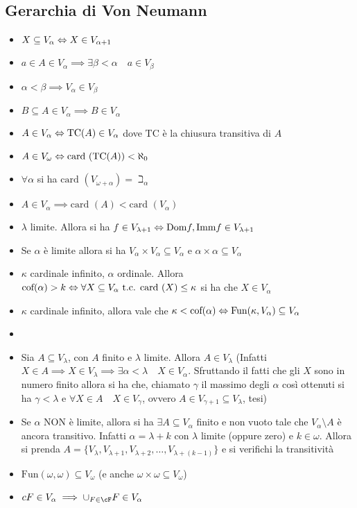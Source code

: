 \documentclass[a4paper,NoNotes,GeneralMath]{stdmdoc}
\newcommand{\card}[1]{\text{card }({#1})}
\newcommand{\cof}[1]{\text{cof}({#1})}
\newcommand{\Fun}{\text{Fun}}
\newcommand{\TC}{\text{TC}}
\newcommand{\Dom}{\text{Dom}}
\newcommand{\Imm}{\text{Imm}}
\begin{document}
	\subsection*{Gerarchia di Von Neumann}
	\begin{itemize}
		\item $X \subseteq V_\alpha \Leftrightarrow X \in V_{\alpha + 1}$
		\item $a \in A \in V_\alpha \implies \exists \beta < \alpha \quad a \in V_\beta$
		\item $\alpha < \beta \implies V_\alpha \in V_\beta$
		\item $B \subseteq A \in V_\alpha \implies B \in V_\alpha$
		\item $A \in V_\alpha \sse \TC(A) \in V_\alpha$ dove $\TC$ è la chiusura transitiva di $A$
		\item $A \in V_\omega \sse \card{\TC(A)} < \aleph_0$
		\item $\forall \alpha$ si ha $\card{V_{\omega + \alpha}} = \beth_\alpha$
		\item $A \in V_\alpha \implies \card{A} < \card{V_\alpha}$
		\item $\lambda$ limite. Allora si ha $f \in V_{\lambda + 1} \sse \Dom f, \Imm f \in V_{\lambda + 1}$
		\item Se $\alpha$ è limite allora si ha $V_\alpha \times V_\alpha \subseteq V_\alpha$ e $\alpha \times \alpha \subseteq V_\alpha$
		\item $\kappa$ cardinale infinito, $\alpha$ ordinale. Allora $\cof{\alpha} > k \sse \forall X \subseteq V_\alpha \tc \card{X} \le \kappa$ si ha che $X \in V_\alpha$
		\item $\kappa$ cardinale infinito, allora vale che $\kappa < \cof{\alpha} \sse \Fun(\kappa, V_\alpha) \subseteq V_\alpha$
		\item 
		\item Sia $A \subseteq V_\lambda$, con $A$ finito e $\lambda$ limite. Allora $A \in V_\lambda$ (Infatti $X \in A \implies X \in V_\lambda \implies \exists \alpha < \lambda \quad X \in V_\alpha$. Sfruttando il fatti che gli $X$ sono in numero finito allora si ha che, chiamato $\gamma$ il massimo degli $\alpha$ così ottenuti si ha $\gamma < \lambda$ e $\forall X \in A \quad X \in V_\gamma$, ovvero $A \in V_{\gamma + 1} \subseteq V_\lambda$, tesi)
		\item Se $\alpha$ NON è limite, allora si ha $\exists A \subseteq V_{\alpha}$ finito e non vuoto tale che $V_\alpha \setminus A$ è ancora transitivo. Infatti $\alpha = \lambda + k$ con $\lambda$ limite (oppure zero) e $k \in \omega$. Allora si prenda $A = \{V_\lambda, V_{\lambda + 1}, V_{\lambda + 2}, \ldots, V_{\lambda + (k - 1)} \}$ e si verifichi la transitività
		\item $\Fun(\omega, \omega) \subseteq V_\omega$ (e anche $\omega \times \omega \subseteq V_\omega$)
		\item $cF \in V_\alpha \implies \cup_{F \in \cF} F \in V_\alpha$
	\end{itemize}
	
\end{document}
